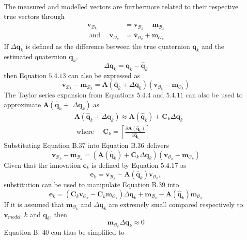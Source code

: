 The measured and modelled vectors are furthermore related to their respective true vectors through
$$
\begin{aligned}
\mathbf{v}_{\mathcal{B}_k} &=\overline{\mathbf{v}}_{\mathcal{B}_k}+\mathbf{m}_{\mathcal{B}_k} \\
\text { and } \quad \mathbf{v}_{\mathcal{O}_k} &=\overline{\mathbf{v}}_{\mathcal{O}_k}+\mathbf{m}_{\mathcal{O}_k}
\end{aligned}
$$
If $\Delta \mathbf{q}_{k}$ is defined as the difference between the true quaternion $\mathbf{q}_{k}$ and the estimated quaternion $\hat{\mathbf{q}}_{k}$,
$$
\Delta \mathbf{q}_{k}=\mathbf{q}_{k}-\hat{\mathbf{q}}_{k}
$$
then Equation $5.4 .13$ can also be expressed as
$$
\mathbf{v}_{\mathcal{B}_k}-\mathbf{m}_{\mathcal{B}_k}=\mathbf{A}\left(\hat{\mathbf{q}}_{k}+\Delta \mathbf{q}_{k}\right)\left(\mathbf{v}_{\mathcal{O}_k}-\mathbf{m}_{\mathcal{O}_k}\right)
$$
The Taylor series expansion from Equations $5.4 .4$ and $5.4 .11$ can also be used to approximate $\mathbf{A}\left(\hat{\mathbf{q}}_{k}+\right.$ $\left.\Delta \mathbf{q}_{k}\right)$ as
$$
\begin{aligned}
&\mathbf{A}\left(\hat{\mathbf{q}}_{k}+\Delta \mathbf{q}_{k}\right) \approx \mathbf{A}\left(\hat{\mathbf{q}}_{k}\right)+\mathbf{C}_{k} \Delta \mathbf{q}_{k} \\
&\text { where } \quad \mathbf{C}_{k}=\left[\frac{\partial \mathbf{A}\left(\hat{\mathbf{q}}_{k}\right)}{\partial \hat{\mathbf{q}}_{k}}\right]
\end{aligned}
$$
Substituting Equation B.37 into Equation B.36 delivers
$$
\mathbf{v}_{\mathcal{B}_k}-\mathbf{m}_{\mathcal{B}_k}=\left(\mathbf{A}\left(\hat{\mathbf{q}}_{k}\right)+\mathbf{C}_{k} \Delta \mathbf{q}_{k}\right)\left(\mathbf{v}_{\mathcal{O}_k}-\mathbf{m}_{\mathcal{O}_k}\right)
$$
Given that the innovation $\mathbf{e}_{k}$ is defined by Equation $5.4 .17$ as
$$
\mathbf{e}_{k}=\mathbf{v}_{\mathcal{B}_k}-\mathbf{A}\left(\hat{\mathbf{q}}_{k}\right) \mathbf{v}_{\mathcal{O}_k},
$$
substitution can be used to manipulate Equation B.39 into
$$
\mathbf{e}_{k}=\left(\mathbf{C}_{k} \mathbf{v}_{\mathcal{O}_k}-\mathbf{C}_{k} \mathbf{m}_{\mathcal{O}_k}\right) \Delta \mathbf{q}_{k}+\mathbf{m}_{\mathcal{B}_k}-\mathbf{A}\left(\hat{\mathbf{q}}_{k}\right) \mathbf{m}_{\mathcal{O}_k}
$$
If it is assumed that $\mathbf{m}_{\mathcal{O}_k}$ and $\Delta \mathbf{q}_{k}$ are extremely small compared respectively to $\mathbf{v}_{m o d e l}, k$ and $\mathbf{q}_{k}$, then
$$
\mathbf{m}_{\mathcal{O}_k} \Delta \mathbf{q}_{k} \approx 0
$$
Equation B. 40 can thus be simplified to
